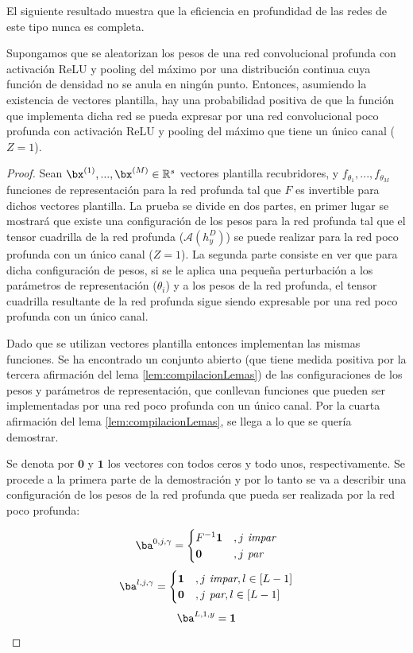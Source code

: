 El siguiente resultado muestra que la eficiencia en profundidad de las redes de este tipo nunca es completa.

\begin{prop} \label{prop:noCompleto}
Supongamos que se aleatorizan los pesos de una red convolucional profunda con activación ReLU y pooling del máximo por una distribución continua cuya función de densidad no se anula en ningún punto. Entonces, asumiendo la existencia de vectores plantilla, hay una probabilidad positiva de que la función que implementa dicha red se pueda expresar por una red convolucional poco profunda con activación ReLU y pooling del máximo que tiene un único canal ($Z = 1$).
\end{prop}
\begin{proof}
Sean $\bx^{(1)},... ,\bx^{(M)}\in\mathbb{R}^s$ vectores plantilla recubridores, y $f_{\theta_1},... ,f_{\theta_M}$ funciones de representación para la red profunda tal que $F$ es invertible para dichos vectores plantilla. La prueba se divide en dos partes, en primer lugar se mostrará que existe una configuración de los pesos para la red profunda tal que el tensor cuadrilla de la red profunda ($\mathcal{A}(h_y^D)$) se puede realizar para la red poco profunda con un único canal ($Z=1$). La segunda parte consiste en ver que para dicha configuración de pesos, si se le aplica una pequeña perturbación a los parámetros de representación ($\theta_i$) y a los pesos de la red profunda, el tensor cuadrilla resultante de la red profunda sigue siendo expresable por una red poco profunda con un único canal. 

Dado que se utilizan vectores plantilla entonces implementan las mismas funciones.  Se ha encontrado un conjunto abierto (que tiene medida positiva por la tercera afirmación del lema \ref{lem:compilacionLemas}) de las configuraciones de los pesos y parámetros de representación, que conllevan funciones que pueden ser implementadas por una red poco profunda con un único canal. Por la cuarta afirmación del lema \ref{lem:compilacionLemas}, se llega a lo que se quería demostrar.

Se denota por $\mathbf{0}$ y $\mathbf{1}$ los vectores con todos ceros y todo unos, respectivamente. Se procede a la primera parte de la demostración y por lo tanto se va a describir una configuración de los pesos de la red profunda que pueda ser realizada por la red poco profunda: 

$$
\ba^{0,j,\gamma} = \begin{cases}
F^{-1}\mathbf{1} &, j\textit{ impar}\\
\mathbf{0} &, j\textit{ par}
\end{cases}
$$
$$
\ba^{l,j,\gamma} = \begin{cases}
\mathbf{1} &, j\textit{ impar}, l \in [L-1]\\
\mathbf{0} &, j\textit{ par}, l \in [L-1]
\end{cases}
$$
$$
\ba^{L,1,y} = \mathbf{1}
$$


\end{proof}
